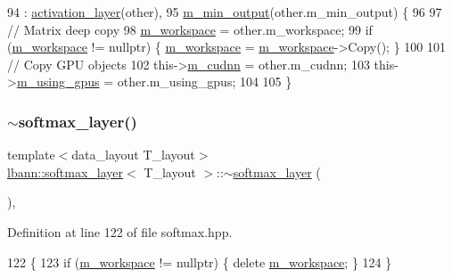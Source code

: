 \begin{DoxyCode}
94     : \hyperlink{classlbann_1_1activation__layer_a7df6f5d21ccdd5a24ad6233a52807c6d}{activation\_layer}(other),
95       \hyperlink{classlbann_1_1softmax__layer_ab3bf2d92f4441923dd0b792c38ec774a}{m\_min\_output}(other.m\_min\_output) \{
96 
97     \textcolor{comment}{// Matrix deep copy}
98     \hyperlink{classlbann_1_1softmax__layer_a604e614de25758f0072308c7efdd5bdb}{m\_workspace} = other.m\_workspace;
99     \textcolor{keywordflow}{if} (\hyperlink{classlbann_1_1softmax__layer_a604e614de25758f0072308c7efdd5bdb}{m\_workspace} != \textcolor{keyword}{nullptr}) \{ \hyperlink{classlbann_1_1softmax__layer_a604e614de25758f0072308c7efdd5bdb}{m\_workspace} = 
      \hyperlink{classlbann_1_1softmax__layer_a604e614de25758f0072308c7efdd5bdb}{m\_workspace}->Copy(); \}
100 
101     \textcolor{comment}{// Copy GPU objects}
102     this->\hyperlink{classlbann_1_1Layer_a08dbb94239e3b8c96329786c57c72e21}{m\_cudnn} = other.m\_cudnn;
103     this->\hyperlink{classlbann_1_1Layer_af7881cb5eff5207c15fa835d65462e8f}{m\_using\_gpus} = other.m\_using\_gpus;
104 
105   \}
\end{DoxyCode}
\mbox{\label{classlbann_1_1softmax__layer_aabd598a9b0cec63e2d4558fd79ecee0d}} 
\subsubsection{\texorpdfstring{$\sim$softmax\+\_\+layer()}{~softmax\_layer()}}
{\footnotesize\ttfamily template$<$data\+\_\+layout T\+\_\+layout$>$ \\
\hyperlink{classlbann_1_1softmax__layer}{lbann\+::softmax\+\_\+layer}$<$ T\+\_\+layout $>$\+::$\sim$\hyperlink{classlbann_1_1softmax__layer}{softmax\+\_\+layer} (\begin{DoxyParamCaption}{ }\end{DoxyParamCaption})\hspace{0.3cm}{\ttfamily [inline]}, {\ttfamily [override]}}



Definition at line 122 of file softmax.\+hpp.


\begin{DoxyCode}
122                             \{
123     \textcolor{keywordflow}{if} (\hyperlink{classlbann_1_1softmax__layer_a604e614de25758f0072308c7efdd5bdb}{m\_workspace} != \textcolor{keyword}{nullptr}) \{ \textcolor{keyword}{delete} \hyperlink{classlbann_1_1softmax__layer_a604e614de25758f0072308c7efdd5bdb}{m\_workspace}; \}
124   \}
\end{DoxyCode}


